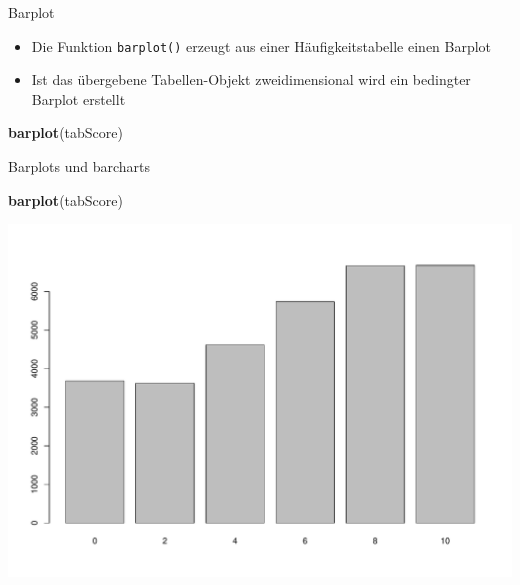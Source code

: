 \documentclass[ignorenonframetext,]{beamer}
\newenvironment{Shaded}{}{}
\newcommand{\KeywordTok}[1]{\textcolor[rgb]{0.00,0.44,0.13}{\textbf{{#1}}}}
\newcommand{\StringTok}[1]{\textcolor[rgb]{0.25,0.44,0.63}{{#1}}}
\newcommand{\NormalTok}[1]{{#1}}
\providecommand{\tightlist}{%
\setlength{\itemsep}{0pt}\setlength{\parskip}{0pt}}
\begin{document}
\begin{frame}[fragile]{Barplot}

\begin{itemize}
\tightlist
\item
  Die Funktion \texttt{barplot()} erzeugt aus einer Häufigkeitstabelle
  einen Barplot
\item
  Ist das übergebene Tabellen-Objekt zweidimensional wird ein bedingter
  Barplot erstellt
\end{itemize}

\begin{Shaded}
\end{Shaded}

\begin{Shaded}
\begin{Highlighting}[]
\KeywordTok{barplot}\NormalTok{(tabScore)}
\end{Highlighting}
\end{Shaded}

\end{frame}

\begin{frame}[fragile]{Barplots und barcharts}

\begin{Shaded}
\begin{Highlighting}[]
\KeywordTok{barplot}\NormalTok{(tabScore)}
\end{Highlighting}
\end{Shaded}

\includegraphics{R_intern_files/figure-beamer/unnamed-chunk-155-1.pdf}

\end{frame}
\end{document}
